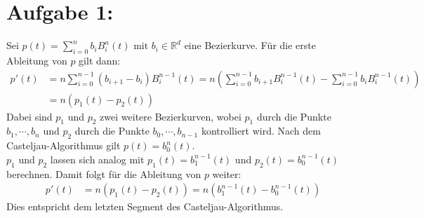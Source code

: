 \section*{Aufgabe 1: }
Sei $p(t) = \sum_{i=0}^nb_iB_i^n(t)$ mit $b_i \in \mathbb{R}^d$ eine Bezierkurve. Für die erste Ableitung von $p$ gilt dann:
\begin{align*}
  p'(t) &= n\sum_{i=0}^{n-1}(b_{i+1} - b_i)B_i^{n-1}(t) =n\left(\sum_{i=0}^{n-1}b_{i+1}B_i^{n-1}(t) - \sum_{i=0}^{n-1}b_iB_i^{n-1}(t)\right)\\
          &= n\left(p_1(t) - p_2(t)\right)
\end{align*}
Dabei sind $p_1$ und $p_2$ zwei weitere Bezierkurven, wobei $p_1$ durch die Punkte $b_1,\cdots,b_n$ und $p_2$ durch die Punkte $b_0, \cdots, b_{n-1}$ kontrolliert wird. Nach dem Casteljau-Algorithmus gilt $p(t) = b_0^n(t)$.\\
$p_1$ und $p_2$ lassen sich analog mit $p_1(t) = b_1^{n-1}(t)$ und $p_2(t) = b_0^{n-1}(t)$ berechnen. Damit folgt für die Ableitung von $p$ weiter:
\begin{align*}
  p'(t) &= n\left(p_1(t) - p_2(t)\right) = n\left(b_1^{n-1}(t) - b_0^{n-1}(t)\right)
\end{align*}
Dies entspricht dem letzten Segment des Casteljau-Algorithmus.